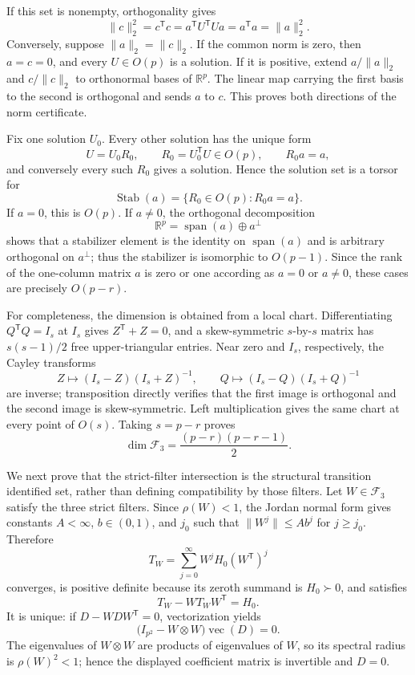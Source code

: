 If this set is nonempty, orthogonality gives
\[
 \lVert c\rVert_2^2=c^{\mathsf T}c
 =a^{\mathsf T}U^{\mathsf T}Ua
 =a^{\mathsf T}a=\lVert a\rVert_2^2.
\]
Conversely, suppose \(\lVert a\rVert_2=\lVert c\rVert_2\).  If the common norm is zero, then \(a=c=0\), and every \(U\in O(p)\) is a solution.  If it is positive, extend \(a/\lVert a\rVert_2\) and \(c/\lVert c\rVert_2\) to orthonormal bases of \(\mathbb R^p\).  The linear map carrying the first basis to the second is orthogonal and sends \(a\) to \(c\).  This proves both directions of the norm certificate.

Fix one solution \(U_0\).  Every other solution has the unique form
\[
 U=U_0R_0,
 \qquad
 R_0=U_0^{\mathsf T}U\in O(p),
 \qquad R_0a=a,
\]
and conversely every such \(R_0\) gives a solution.  Hence the solution set is a torsor for
\[
 \operatorname{Stab}(a)=\{R_0\in O(p):R_0a=a\}.
\]
If \(a=0\), this is \(O(p)\).  If \(a\ne0\), the orthogonal decomposition
\[
 \mathbb R^p=\operatorname{span}(a)\oplus a^\perp
\]
shows that a stabilizer element is the identity on \(\operatorname{span}(a)\) and is arbitrary orthogonal on \(a^\perp\); thus the stabilizer is isomorphic to \(O(p-1)\).  Since the rank of the one-column matrix \(a\) is zero or one according as \(a=0\) or \(a\ne0\), these cases are precisely \(O(p-r)\).

For completeness, the dimension is obtained from a local chart.  Differentiating \(Q^{\mathsf T}Q=I_s\) at \(I_s\) gives \(Z^{\mathsf T}+Z=0\), and a skew-symmetric \(s\)-by-\(s\) matrix has \(s(s-1)/2\) free upper-triangular entries.  Near zero and \(I_s\), respectively, the Cayley transforms
\[
 Z\longmapsto(I_s-Z)(I_s+Z)^{-1},
 \qquad
 Q\longmapsto(I_s-Q)(I_s+Q)^{-1}
\]
are inverse; transposition directly verifies that the first image is orthogonal and the second image is skew-symmetric.  Left multiplication gives the same chart at every point of \(O(s)\).  Taking \(s=p-r\) proves
\[
 \dim\mathcal F_3=\frac{(p-r)(p-r-1)}2.
\]

We next prove that the strict-filter intersection is the structural transition identified set, rather than defining compatibility by those filters.  Let \(W\in\mathcal F_3\) satisfy the three strict filters.  Since \(\rho(W)<1\), the Jordan normal form gives constants \(A<\infty\), \(b\in(0,1)\), and \(j_0\) such that \(\lVert W^j\rVert\le Ab^j\) for \(j\ge j_0\).  Therefore
\[
 T_W=\sum_{j=0}^{\infty}W^jH_0(W^{\mathsf T})^j
\]
converges, is positive definite because its zeroth summand is \(H_0\succ0\), and satisfies
\[
 T_W-WT_WW^{\mathsf T}=H_0.
\]
It is unique: if \(D-WDW^{\mathsf T}=0\), vectorization yields
\[
 \bigl(I_{p^2}-W\otimes W\bigr)\operatorname{vec}(D)=0.
\]
The eigenvalues of \(W\otimes W\) are products of eigenvalues of \(W\), so its spectral radius is \(\rho(W)^2<1\); hence the displayed coefficient matrix is invertible and \(D=0\).

